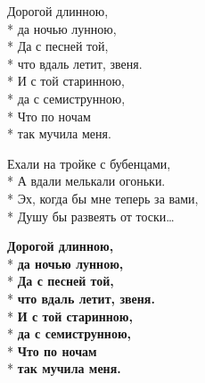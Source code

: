 \medskip

\begin{minipage}{\linewidth}
\hspace*{1.5em}Дорогой длинною,\\*
\hspace*{1.5em}да ночью лунною,\\*
\hspace*{1.5em}Да с песней той,\\*
\hspace*{1.5em}что вдаль летит, звеня.\\*
\hspace*{1.5em}И с той старинною,\\*
\hspace*{1.5em}да с семиструнною,\\*
\hspace*{1.5em}Что по ночам\\*
\hspace*{1.5em}так мучила меня.\\
\end{minipage}\par\medskip\nobreak

\medskip

\begin{minipage}{\linewidth}
Ехали на тройке с бубенцами,\\*
А вдали мелькали огоньки.\\*
Эх, когда бы мне теперь за вами,\\*
Душу бы развеять от тоски… \\
\end{minipage}\par\medskip\nobreak

\medskip

\begin{minipage}{\linewidth}
\hspace*{1.5em}\textbf{Дорогой длинною,}\\*
\hspace*{1.5em}\textbf{да ночью лунною,}\\*
\hspace*{1.5em}\textbf{Да с песней той,}\\*
\hspace*{1.5em}\textbf{что вдаль летит, звеня.}\\*
\hspace*{1.5em}\textbf{И с той старинною,}\\*
\hspace*{1.5em}\textbf{да с семиструнною,}\\*
\hspace*{1.5em}\textbf{Что по ночам}\\*
\hspace*{1.5em}\textbf{так мучила меня.}\\
\end{minipage}

